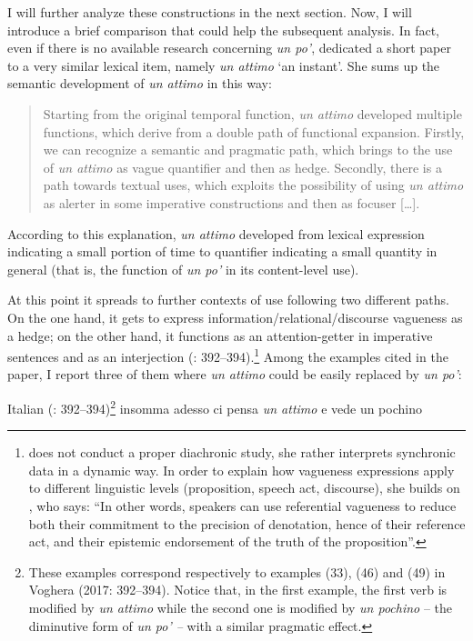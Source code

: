 I will further analyze these constructions in the next section. Now, I will introduce a brief comparison that could help the subsequent analysis. In fact, even if there is no available research concerning \textit{un po’}, \citet{Voghera2017} dedicated a short paper to a very similar lexical item, namely \textit{un attimo} ‘an instant’. She sums up the semantic development of \textit{un attimo} in this way:

\begin{quote}
Starting from the original temporal function, \textit{un attimo} developed multiple functions, which derive from a double path of functional expansion. Firstly, we can recognize a semantic and pragmatic path, which brings to the use of \textit{un attimo} as vague quantifier and then as hedge. Secondly, there is a path towards textual uses, which exploits the possibility of using \textit{un attimo} as alerter in some imperative constructions and then as focuser […]. \citep[1]{Voghera2017}
\end{quote}

According to this explanation, \textit{un attimo} developed from lexical expression indicating a small portion of time to quantifier indicating a small quantity in general (that is, the function of \textit{un po’} in its content-level use). 

At this point it spreads to further contexts of use following two different paths. On the one hand, it gets to express information/relational/discourse vagueness as a hedge; on the other hand, it functions as an attention-getter in imperative sentences and as an interjection (\citealt{Voghera2017}: 392–394).\footnote{\citet{Voghera2017} does not conduct a proper diachronic study, she rather interprets synchronic data in a dynamic way. In order to explain how vagueness expressions apply to different linguistic levels (proposition, speech act, discourse), she builds on \citet[58]{Caffi2007}, who says: “In other words, speakers can use referential vagueness to reduce both their commitment to the precision of denotation, hence of their reference act, and their epistemic endorsement of the truth of the proposition”.} Among the examples cited in the paper, I report three of them where \textit{un attimo} could be easily replaced by \textit{un po’}:

\ea%
    \label{ex:key:62}

          Italian (\citealt{Voghera2017}: 392–394)\footnote{These examples correspond respectively to examples (33), (46) and (49) in Voghera (2017: 392–394). Notice that, in the first example, the first verb is modified by \textit{un attimo} while the second one is modified by \textit{un pochino} – the diminutive form of \textit{un po’ –} with a similar pragmatic effect.}
\ea \label{ex:key:62a} insomma adesso ci pensa \textit{un attimo} e vede un pochino

